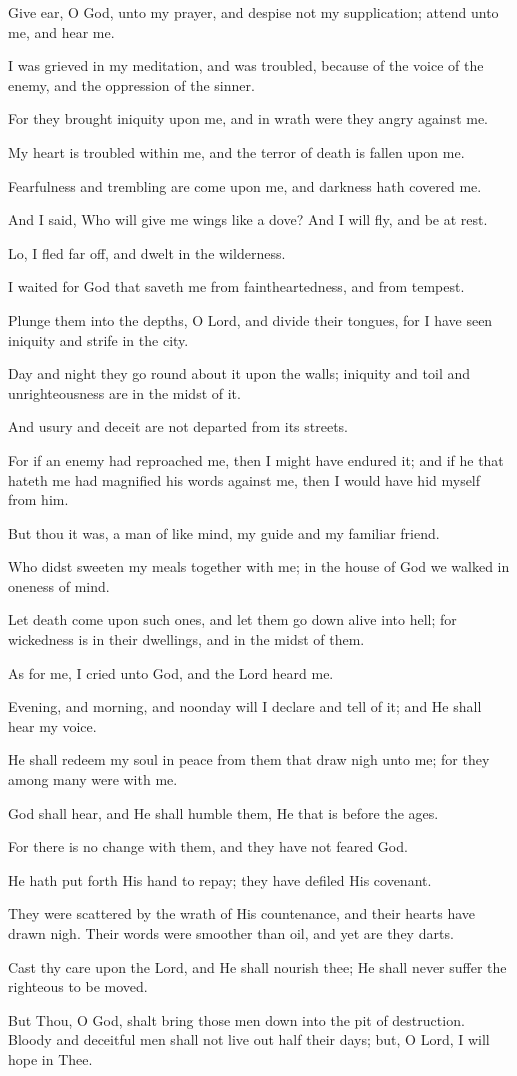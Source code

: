 Give ear, O God, unto my prayer, and despise not my supplication; attend unto me, and hear me.

I was grieved in my meditation, and was troubled, because of the voice of the enemy, and the oppression of the sinner.

For they brought iniquity upon me, and in wrath were they angry against me.

My heart is troubled within me, and the terror of death is fallen upon me.

Fearfulness and trembling are come upon me, and darkness hath covered me.

And I said, Who will give me wings like a dove? And I will fly, and be at rest.

Lo, I fled far off, and dwelt in the wilderness.

I waited for God that saveth me from faintheartedness, and from tempest.

Plunge them into the depths, O Lord, and divide their tongues, for I have seen iniquity and strife in the city.

Day and night they go round about it upon the walls; iniquity and toil and unrighteousness are in the midst of it.

And usury and deceit are not departed from its streets.

For if an enemy had reproached me, then I might have endured it; and if he that hateth me had magnified his words against me, then I would have hid myself from him.

But thou it was, a man of like mind, my guide and my familiar friend.

Who didst sweeten my meals together with me; in the house of God we walked in oneness of mind.

Let death come upon such ones, and let them go down alive into hell; for wickedness is in their dwellings, and in the midst of them.

As for me, I cried unto God, and the Lord heard me.

Evening, and morning, and noonday will I declare and tell of it; and He shall hear my voice.

He shall redeem my soul in peace from them that draw nigh unto me; for they among many were with me.

God shall hear, and He shall humble them, He that is before the ages.

For there is no change with them, and they have not feared God.

He hath put forth His hand to repay; they have defiled His covenant.

They were scattered by the wrath of His countenance, and their hearts have drawn nigh. Their words were smoother than oil, and yet are they darts.

Cast thy care upon the Lord, and He shall nourish thee; He shall never suffer the righteous to be moved.

But Thou, O God, shalt bring those men down into the pit of destruction. Bloody and deceitful men shall not live out half their days; but, O Lord, I will hope in Thee.
